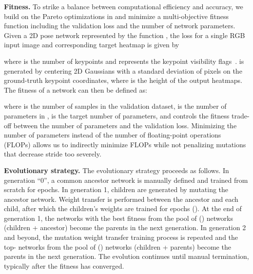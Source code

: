 \documentclass[final]{cvpr}
\begin{document}
\medskip\noindent\textbf{Fitness.} To strike a balance between computational efficiency and accuracy, we build on the Pareto optimizations in \cite{tan2019mnasnet, tan2019efficientnet} and minimize a multi-objective fitness function including the validation loss and the number of network parameters. Given a 2D pose network represented by the function , the loss for a single RGB input image  and corresponding target heatmap  is given by
\newcommand{\norm}[1]{\left\lVert#1\right\rVert}
\vspace{-2pt}

where  is the number of keypoints and  represents the keypoint visibility flags~\cite{lin2014microsoft}.  is generated by centering 2D Gaussians with a standard deviation of  pixels on the ground-truth keypoint coordinates, where  is the height of the output heatmaps. The fitness of a network  can then be defined as:
\vspace{-8pt}

where  is the number of samples in the validation dataset,  is the number of parameters in ,  is the target number of parameters, and  controls the fitness trade-off between the number of parameters and the validation loss. Minimizing the number of parameters instead of the number of floating-point operations (FLOPs) allows us to indirectly minimize FLOPs while not penalizing mutations that decrease stride too severely. 

\medskip\noindent\textbf{Evolutionary strategy.} The evolutionary strategy proceeds as follows. In generation ``0'', a common ancestor network is manually defined and trained from scratch for  epochs. In generation 1,  children are generated by mutating the ancestor network. Weight transfer is performed between the ancestor and each child, after which the children's weights are trained for  epochs (). At the end of generation 1, the  networks with the best fitness from the pool of () networks (children + ancestor) become the parents in the next generation. In generation 2 and beyond, the mutation  weight transfer  training process is repeated and the top- networks from the pool of () networks (children + parents) become the parents in the next generation. The evolution continues until manual termination, typically after the fitness has converged. 
\end{document}
